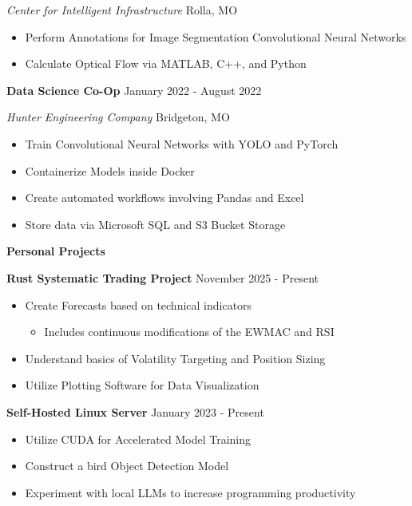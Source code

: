 \documentclass[11pt]{article}
\begin{document}
\textsl{Center for Intelligent Infrastructure} \hfill Rolla, MO
\begin{itemize}[noitemsep, topsep=0pt, partopsep=0pt, parsep=0pt, itemsep=0pt]
    \item Perform Annotations for Image Segmentation Convolutional Neural Networks
    \item Calculate Optical Flow via MATLAB, C++, and Python
\end{itemize}


\textbf{Data Science Co-Op} \hfill January 2022 - August 2022

\textsl{Hunter Engineering Company} \hfill Bridgeton, MO
\begin{itemize}[noitemsep, topsep=0pt, partopsep=0pt, parsep=0pt, itemsep=0pt]
    \item Train Convolutional Neural Networks with YOLO and PyTorch
    \item Containerize Models inside Docker
    \item Create automated workflows involving Pandas and Excel
    \item Store data via Microsoft SQL and S3 Bucket Storage
\end{itemize}


\begin{center}
    \textbf{Personal Projects}
\end{center}

\textbf{Rust Systematic Trading Project} \hfill November 2025 - Present
\begin{itemize}[noitemsep, topsep=0pt, partopsep=0pt, parsep=0pt, itemsep=0pt]
    \item Create Forecasts based on technical indicators
    \begin{itemize}[noitemsep, topsep=0pt, partopsep=0pt, parsep=0pt, itemsep=0pt]
        \item Includes continuous modifications of the EWMAC and RSI
    \end{itemize}
    \item Understand basics of Volatility Targeting and Position Sizing
    \item Utilize Plotting Software for Data Visualization
\end{itemize}

\textbf{Self-Hosted Linux Server} \hfill January 2023 - Present
\begin{itemize}[noitemsep, topsep=0pt, partopsep=0pt, parsep=0pt, itemsep=0pt]
    \item Utilize CUDA for Accelerated Model Training
    \item Construct a bird Object Detection Model
    \item Experiment with local LLMs to increase programming productivity
\end{itemize}
\end{document}
